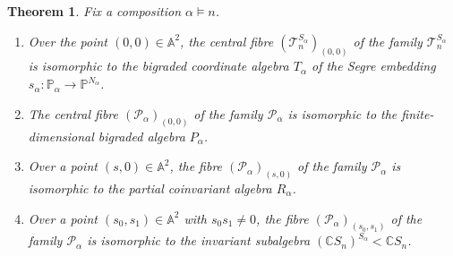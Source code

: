 \documentclass[a4paper,11pt]{amsart}
\theoremstyle{plain}
\newtheorem{theorem}{Theorem}[section]
\theoremstyle{definition}
\newcommand{\A}{\mathbb{A}}
\newcommand{\C}{\mathbb{C}}
\newcommand{\CP}{\mathscr{P}}
\newcommand{\CT}{\mathcal{T}} %
\newcommand{\pa}{T} %
\renewcommand{\P}{\mathbb{P}}
\begin{document}
\begin{theorem} \label{thm:Palpha_def}
Fix a composition $\alpha \vDash n$.
\begin{enumerate} \label{thm:invariantisPalpha}
\item[(i)] Over the point $(0,0)\in\A^2$, the central fibre $(\CT_n^{S_\alpha})_{(0,0)}$ of the family $\CT_n^{S_\alpha}$  is isomorphic to the bigraded coordinate algebra $\pa_\alpha$ of the Segre embedding $s_\alpha\colon \P_\alpha \rightarrow \P^{N_\alpha}$. 
\item[(ii)] The central fibre $(\CP_\alpha)_{(0,0)}$ of the family $\CP_\alpha$ is isomorphic to the finite-dimensional bigraded algebra $P_\alpha$.
\item[(iii)] Over a point $(s,0)\in\A^2$, the fibre $(\CP_\alpha)_{(s,0)}$ of the family $\CP_\alpha$ is isomorphic to the partial coinvariant algebra $R_\alpha$. 
\item[(iv)] Over a point $(s_0,s_1)\in\A^2$ with $s_0s_1\neq 0$, the fibre $(\CP_\alpha)_{(s_0,s_1)}$ of the family $\CP_\alpha$ is isomorphic to the invariant subalgebra $(\C S_n)^{S_\alpha}<\C S_n$. 
\end{enumerate} 
\end{theorem}
\end{document}

